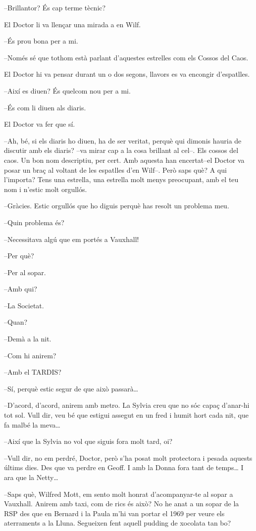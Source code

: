 --Brillantor? És cap terme tècnic?

El Doctor li va llençar una mirada a en Wilf.

--És prou bona per a mi.

--Només sé que tothom està parlant d'aquestes estrelles com els Cossos
del Caos.

El Doctor hi va pensar durant un o dos segons, llavors es va encongir
d'espatlles.

--Així es diuen? És quelcom nou per a mi.

--És com li diuen als diaris.

El Doctor va fer que sí.

--Ah, bé, si els diaris ho diuen, ha de ser veritat, perquè qui dimonis
hauria de discutir amb els diaris? --va mirar cap a la cosa brillant al
cel--. Els cossos del caos. Un bon nom descriptiu, per cert. Amb aquesta
han encertat--el Doctor va posar un braç al voltant de les espatlles
d'en Wilf--. Però saps què? A qui l'importa? Tens una estrella, una
estrella molt menys preocupant, amb el teu nom i n'estic molt orgullós.

--Gràcies. Estic orgullós que ho diguis perquè has resolt un problema
meu.

--Quin problema és?

--Necessitava algú que em portés a Vauxhall!

--Per què?

--Per al sopar.

--Amb qui?

--La Societat.

--Quan?

--Demà a la nit.

--Com hi anirem?

--Amb el TARDIS?

--Sí, perquè estic segur de que això passarà\ldots{}

--D'acord, d'acord, anirem amb metro. La Sylvia creu que no sóc capaç
d'anar-hi tot sol. Vull dir, veu bé que estigui assegut en un fred i
humit hort cada nit, que fa malbé la meva\ldots{}

--Així que la Sylvia no vol que siguis fora molt tard, oi?

--Vull dir, no em perdré, Doctor, però s'ha posat molt protectora i
pesada aquests últims dies. Des que va perdre en Geoff. I amb la Donna
fora tant de temps\ldots{} I ara que la Netty\ldots{}

--Saps què, Wilfred Mott, em sento molt honrat d'acompanyar-te al sopar
a Vauxhall. Anirem amb taxi, com de rics és això? No he anat a un sopar
de la RSP des que en Bernard i la Paula m'hi van portar el 1969 per
veure els aterraments a la Lluna. Segueixen fent aquell pudding de
xocolata tan bo?

